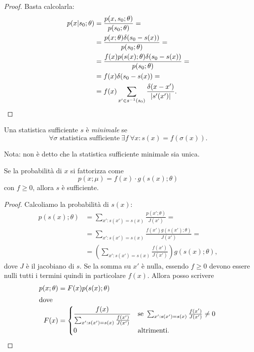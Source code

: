\begin{proof}
	Basta calcolarla:
	\begin{align*}
		p(x|s_0;\theta)
		&= \frac {p(x,s_0;\theta)} {p(s_0;\theta)} = \\
		&= \frac {p(x;\theta) \delta(s_0-s(x))} {p(s_0;\theta)} = \\
		&= \frac {f(x) p(s(x);\theta) \delta(s_0-s(x))} {p(s_0;\theta)} = \\
		&= f(x) \delta(s_0-s(x)) = \\
		&= f(x) \sum_{x'\in s^{-1}(s_0)} \frac {\delta(x-x')} {|s'(x')|}. \qedhere
	\end{align*}
\end{proof}

\begin{definition}
	Una statistica sufficiente $s$ è \emph{minimale} se
	\begin{equation*}
		\forall \sigma \text{ statistica sufficiente}\ \exists f\ \forall x:
		s(x) = f(\sigma(x)).
	\end{equation*}
\end{definition}
\noindent Nota: non è detto che la statistica sufficiente minimale sia unica.

\begin{theorem}
	\label{th:suffatt}
	Se la probabilità di $x$ si fattorizza come
	\begin{equation*}
		p(x;\mu) = f(x)\cdot g(s(x);\theta)
	\end{equation*}
	con $f\ge 0$, allora $s$ è sufficiente.
\end{theorem}

\begin{proof}
	Calcoliamo la probabilità di $s(x)$:
	\begin{align*}
		p(s(x);\theta)
		&= \sum_{x':s(x')=s(x)} \frac{p(x';\theta)}{J(x')} = \\
		&= \sum_{x':s(x')=s(x)} \frac{f(x') g(s(x');\theta)}{J(x')} = \\
		&= \left( \sum_{x':s(x')=s(x)} \frac{f(x')}{J(x')} \right) g(s(x);\theta),
	\end{align*}
	dove $J$ è il jacobiano di $s$.
	Se la somma su $x'$ è nulla,
	essendo $f\ge 0$ devono essere nulli tutti i termini quindi in particolare $f(x)$.
	Allora posso scrivere
	\begin{align*}
		p(x;\theta)
		&= F(x) p(s(x);\theta) \\
		\intertext{dove}
		F(x)
		&= \begin{cases}
			\displaystyle\frac{f(x)}{\sum_{x':s(x')=s(x)} \frac{f(x')}{J(x')}}
			& \text{se }\sum_{x':s(x')=s(x)} \frac{f(x')}{J(x')} \neq 0 \\
			0 & \text{altrimenti.}
		\end{cases} \qedhere
	\end{align*}
\end{proof}


